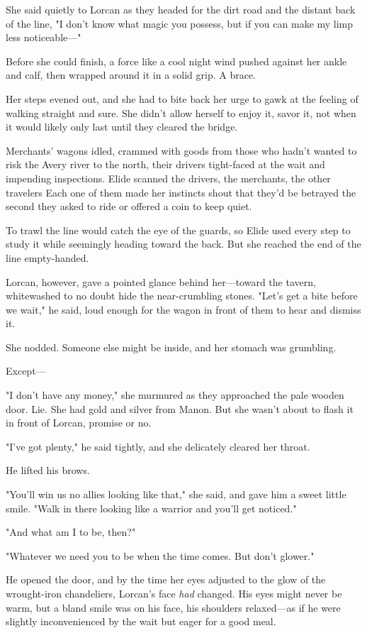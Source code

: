 She said quietly to Lorcan as they headed for the dirt road and the distant back of the line, "I don't know what magic you possess, but if you can make my limp less noticeable---"

Before she could finish, a force like a cool night wind pushed against her ankle and calf, then wrapped around it in a solid grip. A brace.

Her steps evened out, and she had to bite back her urge to gawk at the feeling of walking straight and sure. She didn't allow herself to enjoy it, savor it, not when it would likely only last until they cleared the bridge.

Merchants' wagons idled, crammed with goods from those who hadn't wanted to risk the Avery river to the north, their drivers tight-faced at the wait and impending inspections. Elide scanned the drivers, the merchants, the other travelers  Each one of them made her instincts shout that they'd be betrayed the second they asked to ride or offered a coin to keep quiet.

To trawl the line would catch the eye of the guards, so Elide used every step to study it while seemingly heading toward the back. But she reached the end of the line empty-handed.

Lorcan, however, gave a pointed glance behind her---toward the tavern, whitewashed to no doubt hide the near-crumbling stones. "Let's get a bite before we wait," he said, loud enough for the wagon in front of them to hear and dismiss it.

She nodded. Someone else might be inside, and her stomach was grumbling.

Except---

"I don't have any money," she murmured as they approached the pale wooden door. Lie. She had gold and silver from Manon. But she wasn't about to flash it in front of Lorcan, promise or no.

"I've got plenty," he said tightly, and she delicately cleared her throat.

He lifted his brows.

"You'll win us no allies looking like that," she said, and gave him a sweet little smile. "Walk in there looking like a warrior and you'll get noticed."

"And what am I to be, then?"

"Whatever we need you to be when the time comes. But  don't glower."

He opened the door, and by the time her eyes adjusted to the glow of the wrought-iron chandeliers, Lorcan's face \emph{had} changed. His eyes might never be warm, but a bland smile was on his face, his shoulders relaxed---as if he were slightly inconvenienced by the wait but eager for a good meal.

